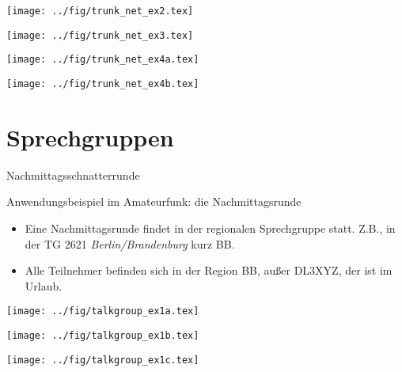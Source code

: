 \documentclass[aspectratio=169]{beamer}
\begin{document}
\begin{frame}
\centering
\texttt{[image: ../fig/trunk\_net\_ex2.tex]}
\end{frame}

\begin{frame}
\centering
\texttt{[image: ../fig/trunk\_net\_ex3.tex]}
\end{frame}

\begin{frame}
\centering
\texttt{[image: ../fig/trunk\_net\_ex4a.tex]}
\end{frame}

\begin{frame}
\centering
\texttt{[image: ../fig/trunk\_net\_ex4b.tex]}
\end{frame}

\section{Sprechgruppen}
\begin{frame}{Nachmittagsschnatterrunde}
\begin{block}{Anwendungsbeispiel im Amateurfunk: die Nachmittagsrunde}
\begin{itemize}
 \item Eine Nachmittagsrunde findet in der regionalen Sprechgruppe statt. Z.B., in der TG 2621 \emph{Berlin/Brandenburg} kurz BB.
 \item Alle Teilnehmer befinden sich in der Region BB, außer DL3XYZ, der ist im Urlaub.
\end{itemize} 
\end{block}
\end{frame}

\begin{frame}
\centering
\texttt{[image: ../fig/talkgroup\_ex1a.tex]}
\end{frame}

\begin{frame}
\centering
\texttt{[image: ../fig/talkgroup\_ex1b.tex]}
\end{frame}

\begin{frame}
\centering
\texttt{[image: ../fig/talkgroup\_ex1c.tex]}
\end{frame}
\end{document}
